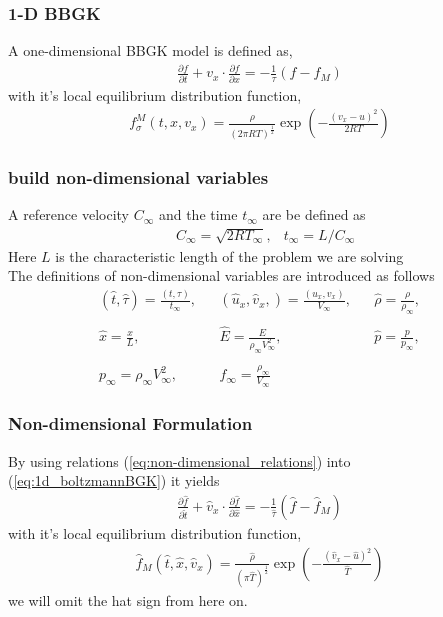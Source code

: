 \begin{frame} \frametitle{1-D BBGK}
	A one-dimensional BBGK model is defined as,
	\begin{align}
	\frac{\partial{f}}{\partial{t}} + 
	v_x\cdot\frac{\partial f}{\partial x} =
	- \frac{1}{\tau} (f-f_M)
	\label{eq:1d_boltzmannBGK}
	\end{align}
	with it's local equilibrium distribution function,
	\begin{align}
	f_\sigma^{M}(t,x,v_x)= \frac{\rho}{(2 \pi RT)^{\frac{1}{2}}} \exp\left(-{\frac{(v_x-u)^2}{2 R T}} \right)
	\end{align}
\end{frame}

\begin{frame} \frametitle{build non-dimensional variables}
	A reference velocity $C_\infty$ and the time $t_\infty$ are be defined as
	\begin{align}
		&C_{\infty} = \sqrt{2RT_{\infty}}, &t_{\infty} = L/C_{\infty}
	\end{align}
	Here $L$ is the characteristic length of the problem we are solving \\
	The definitions of non-dimensional variables are introduced as follows 
	\begin{subequations}\label{eq:non-dimensional_relations}
		\begin{align}
		&(\hat{t}, \hat{\tau})=\frac{(t,\tau)}{t_\infty},&
		&(\hat u_x,\hat v_x,)=\frac{(u_x,v_x)}{V_\infty},& 
		&\hat{\rho}=\frac{\rho}{\rho_\infty},&\\
		\nonumber \\ 
		&\hat{x}=\frac{x}{L},& 
		&\hat{E}=\frac{E}{\rho_\infty V_\infty^2},& 
		&\hat{p}=\frac{p}{p_\infty},&  \\ 
		\nonumber \\ 
		&p_\infty = \rho_\infty V_\infty^2,& 
		&f_\infty = \frac{\rho_\infty}{V_\infty}&
		\end{align}
	\end{subequations}
\end{frame}

\begin{frame} \frametitle{Non-dimensional Formulation}
	By using relations (\ref{eq:non-dimensional_relations}) into (\ref{eq:1d_boltzmannBGK}) it yields
	\begin{align}
	\frac{\partial \hat{f}}{\partial \hat{t}} + 
	\hat{v}_x\cdot\frac{\partial \hat{f}}{\partial \hat{x}} =
	- \frac{1}{\hat{\tau}} (\hat{f}-\hat{f}_M)
	\label{eq:1d_non_dimensional_boltzmannBGK}
	\end{align}
	with it's local equilibrium distribution function,
	\begin{align}
	\hat{f}_{M}(\hat{t},\hat{x},\hat{v}_x) = 
	\frac{\hat{\rho}}{(\pi \hat{T})^{\frac{1}{2}}} 
	\exp\left(-{\frac{(\hat{v}_x-\hat{u})^2}{\hat{T}}} \right)
	\label{eq:1d_non_dimensional_distrib}
	\end{align}
	we will omit the hat sign from here on.
\end{frame}